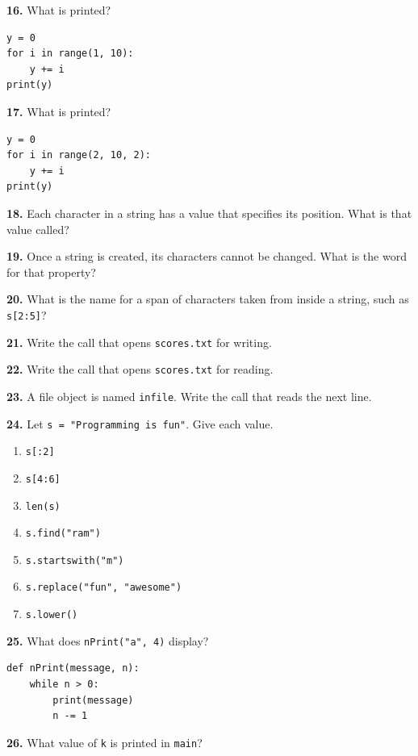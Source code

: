 \documentclass[11pt]{article}
\begin{document}
\textbf{16.} What is printed?

\begin{lstlisting}
y = 0
for i in range(1, 10):
    y += i
print(y)
\end{lstlisting}

\textbf{17.} What is printed?

\begin{lstlisting}
y = 0
for i in range(2, 10, 2):
    y += i
print(y)
\end{lstlisting}

\textbf{18.} Each character in a string has a value that specifies its position. What is that value called?

\textbf{19.} Once a string is created, its characters cannot be changed. What is the word for that property?

\textbf{20.} What is the name for a span of characters taken from inside a string, such as \texttt{s[2:5]}?

\textbf{21.} Write the call that opens \texttt{scores.txt} for writing.

\textbf{22.} Write the call that opens \texttt{scores.txt} for reading.

\textbf{23.} A file object is named \texttt{infile}. Write the call that reads the next line.

\textbf{24.} Let \texttt{s = "Programming is fun"}. Give each value.

\begin{enumerate}
    \item[a.] \texttt{s[:2]}
    \item[b.] \texttt{s[4:6]}
    \item[c.] \texttt{len(s)}
    \item[d.] \texttt{s.find("ram")}
    \item[e.] \texttt{s.startswith("m")}
    \item[f.] \texttt{s.replace("fun", "awesome")}
    \item[g.] \texttt{s.lower()}
\end{enumerate}

\textbf{25.} What does \texttt{nPrint("a", 4)} display?

\begin{lstlisting}
def nPrint(message, n):
    while n > 0:
        print(message)
        n -= 1
\end{lstlisting}

\textbf{26.} What value of \texttt{k} is printed in \texttt{main}?
\end{document}
